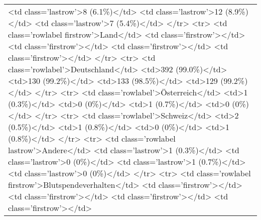 \begin{table}[!tbp]
\begin{center}
\begin{tabular}{l}
\textless td class='lastrow'\textgreater 8 (6.1\%)\textless /td\textgreater 
\textless td class='lastrow'\textgreater 12 (8.9\%)\textless /td\textgreater 
\textless td class='lastrow'\textgreater 7 (5.4\%)\textless /td\textgreater 
\textless /tr\textgreater 
\textless tr\textgreater 
\textless td class='rowlabel firstrow'\textgreater Land\textless /td\textgreater 
\textless td class='firstrow'\textgreater \textless /td\textgreater 
\textless td class='firstrow'\textgreater \textless /td\textgreater 
\textless td class='firstrow'\textgreater \textless /td\textgreater 
\textless td class='firstrow'\textgreater \textless /td\textgreater 
\textless /tr\textgreater 
\textless tr\textgreater 
\textless td class='rowlabel'\textgreater Deutschland\textless /td\textgreater 
\textless td\textgreater 392 (99.0\%)\textless /td\textgreater 
\textless td\textgreater 130 (99.2\%)\textless /td\textgreater 
\textless td\textgreater 133 (98.5\%)\textless /td\textgreater 
\textless td\textgreater 129 (99.2\%)\textless /td\textgreater 
\textless /tr\textgreater 
\textless tr\textgreater 
\textless td class='rowlabel'\textgreater Österreich\textless /td\textgreater 
\textless td\textgreater 1 (0.3\%)\textless /td\textgreater 
\textless td\textgreater 0 (0\%)\textless /td\textgreater 
\textless td\textgreater 1 (0.7\%)\textless /td\textgreater 
\textless td\textgreater 0 (0\%)\textless /td\textgreater 
\textless /tr\textgreater 
\textless tr\textgreater 
\textless td class='rowlabel'\textgreater Schweiz\textless /td\textgreater 
\textless td\textgreater 2 (0.5\%)\textless /td\textgreater 
\textless td\textgreater 1 (0.8\%)\textless /td\textgreater 
\textless td\textgreater 0 (0\%)\textless /td\textgreater 
\textless td\textgreater 1 (0.8\%)\textless /td\textgreater 
\textless /tr\textgreater 
\textless tr\textgreater 
\textless td class='rowlabel lastrow'\textgreater Andere\textless /td\textgreater 
\textless td class='lastrow'\textgreater 1 (0.3\%)\textless /td\textgreater 
\textless td class='lastrow'\textgreater 0 (0\%)\textless /td\textgreater 
\textless td class='lastrow'\textgreater 1 (0.7\%)\textless /td\textgreater 
\textless td class='lastrow'\textgreater 0 (0\%)\textless /td\textgreater 
\textless /tr\textgreater 
\textless tr\textgreater 
\textless td class='rowlabel firstrow'\textgreater Blutspendeverhalten\textless /td\textgreater 
\textless td class='firstrow'\textgreater \textless /td\textgreater 
\textless td class='firstrow'\textgreater \textless /td\textgreater 
\textless td class='firstrow'\textgreater \textless /td\textgreater 
\textless td class='firstrow'\textgreater \textless /td\textgreater 

\end{tabular}
\end{center}
\end{table}
